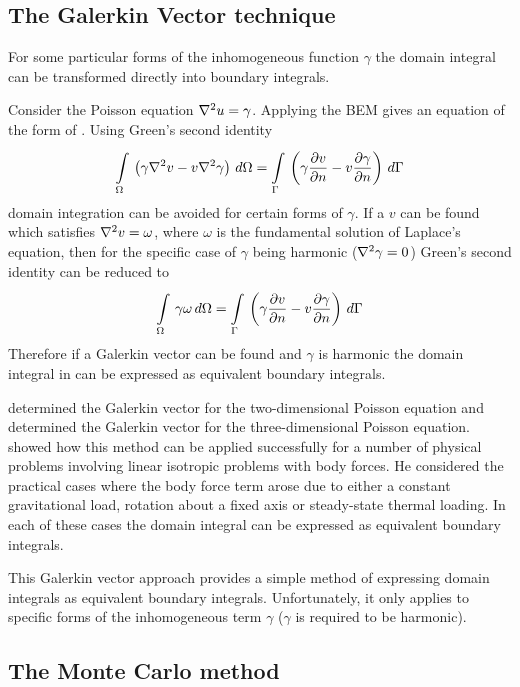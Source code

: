 \subsection{The Galerkin Vector technique}

For some particular forms of the inhomogeneous function $\gamma$ the domain
integral can be transformed directly into boundary integrals. 

Consider the Poisson equation $\laplacian{}{u} = \gamma$.  Applying the BEM gives
an equation of the form of .  Using Green's second
identity
\begin{equation}
  \goneint{\pbrac{\gamma \laplacian{}{v} - v
  \laplacian{}{\gamma}}}{\Omega} = 
  \goneint{\pbrac{\gamma \delby{v}{n} - v \delby{\gamma}{n}}}{\Gamma}
\end{equation}
domain integration can be avoided for certain forms of $\gamma$.  If a
 $v$ can be found which satisfies $\laplacian{}{v} = \omega$,
where $\omega$ is the fundamental solution of Laplace's equation, then for
the specific case of $\gamma$ being harmonic ($\laplacian{}{\gamma} = 0$) Green's
second identity can be reduced to
\begin{equation}
     \displaystyle\int\limits_{\Omega}^{} \,\gamma \omega\,d\Omega   =    \displaystyle\int\limits_{\Gamma}^{} \,\left( \gamma  \dfrac{\partial v}{\partial n}  - v
       \dfrac{\partial \gamma}{\partial n}  \right)\,d\Gamma   
\end{equation}
Therefore if a Galerkin vector can be found and $\gamma$ is harmonic the
domain integral in  can be expressed as equivalent
boundary integrals.

 determined the Galerkin vector for the
two-dimensional Poisson equation and  determined
the Galerkin vector for the three-dimensional Poisson equation.
 showed how this method can be applied
successfully for a number of physical problems involving linear isotropic
problems with body forces.  He considered the practical cases where the
body force term arose due to either a constant gravitational load, rotation
about a fixed axis or steady-state thermal loading.  In each of these cases
the domain integral can be expressed as equivalent boundary integrals.

This Galerkin vector approach provides a simple method of expressing 
domain integrals as equivalent boundary integrals.  Unfortunately, it only
applies to specific forms of the inhomogeneous term $\gamma$ (\ie $\gamma$
is required to be harmonic).

\subsection{The Monte Carlo method}

